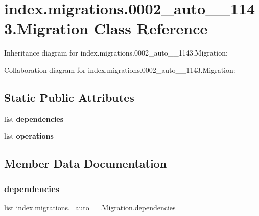 \hypertarget{classindex_1_1migrations_1_10002__auto__20171008__1143_1_1Migration}{}\section{index.\+migrations.0002\+\_\+auto\+\_\+\_\+1143.Migration Class Reference}
\label{classindex_1_1migrations_1_10002__auto__20171008__1143_1_1Migration}


Inheritance diagram for index.\+migrations.0002\+\_\+auto\+\_\+\_\+1143.Migration\+:


Collaboration diagram for index.\+migrations.0002\+\_\+auto\+\_\+\_\+1143.Migration\+:
\subsection*{Static Public Attributes}
\begin{DoxyCompactItemize}
\item 
list {\bfseries dependencies}
\item 
list {\bfseries operations}
\end{DoxyCompactItemize}


\subsection{Member Data Documentation}
\mbox{\label{classindex_1_1migrations_1_10002__auto__20171008__1143_1_1Migration_ae6a608859315191520278327bcc52536}} 
\subsubsection{\texorpdfstring{dependencies}{dependencies}}
{\footnotesize\ttfamily list index.\+migrations.\+\_\+auto\+\_\+\_.\+Migration.\+dependencies\hspace{0.3cm}{\ttfamily [static]}}

